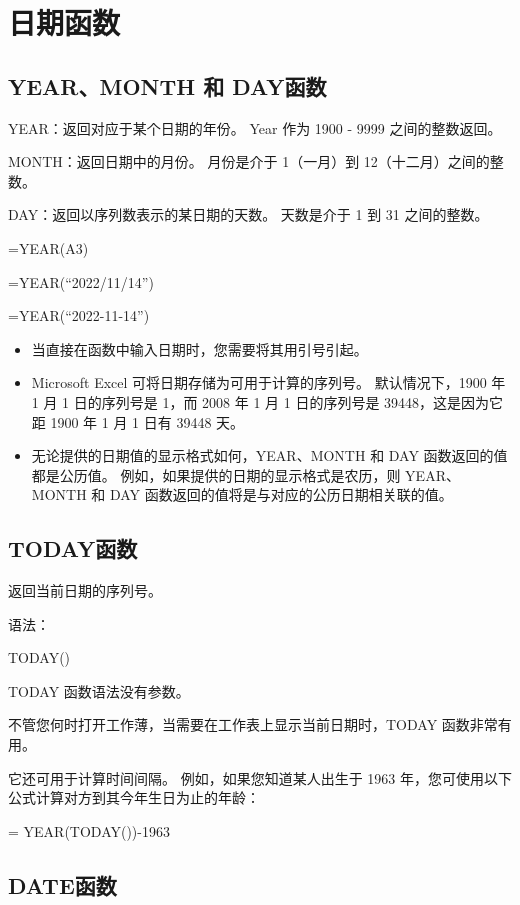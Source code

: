 \section{日期函数}
\subsection{YEAR、MONTH 和 DAY函数}

YEAR：返回对应于某个日期的年份。 Year 作为 1900 - 9999 之间的整数返回。

MONTH：返回日期中的月份。 月份是介于 1（一月）到 12（十二月）之间的整数。

DAY：返回以序列数表示的某日期的天数。 天数是介于 1 到 31 之间的整数。

=YEAR(A3)

=YEAR(``2022/11/14'')

=YEAR(``2022-11-14'')

\begin{itemize}
    \item 当直接在函数中输入日期时，您需要将其用引号引起。
    \item Microsoft Excel 可将日期存储为可用于计算的序列号。 默认情况下，1900 年 1 月 1 日的序列号是 1，而 2008 年 1 月 1 日的序列号是 39448，这是因为它距 1900 年 1 月 1 日有 39448 天。
    \item 无论提供的日期值的显示格式如何，YEAR、MONTH 和 DAY 函数返回的值都是公历值。 例如，如果提供的日期的显示格式是农历，则 YEAR、MONTH 和 DAY 函数返回的值将是与对应的公历日期相关联的值。
\end{itemize}

\subsection{TODAY函数}

返回当前日期的序列号。

语法：

TODAY()

TODAY 函数语法没有参数。

不管您何时打开工作薄，当需要在工作表上显示当前日期时，TODAY 函数非常有用。 

它还可用于计算时间间隔。 例如，如果您知道某人出生于 1963 年，您可使用以下公式计算对方到其今年生日为止的年龄：

= YEAR(TODAY())-1963

\subsection{DATE函数}

